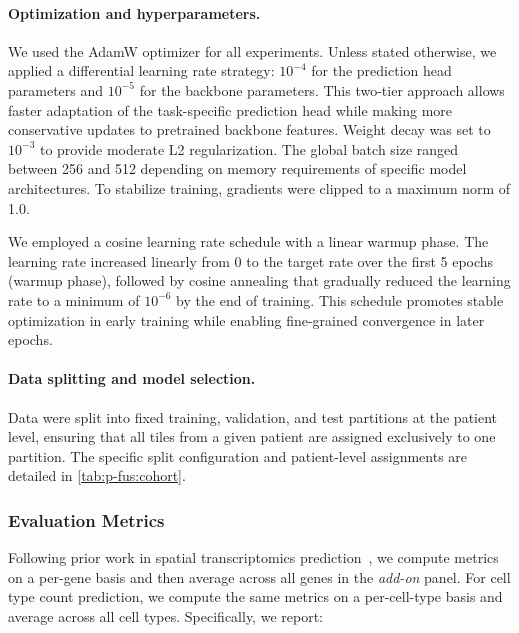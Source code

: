\paragraph{Optimization and hyperparameters.}
We used the AdamW optimizer for all experiments. Unless stated otherwise, we applied a differential learning rate strategy: $10^{-4}$ for the prediction head parameters and $10^{-5}$ for the backbone parameters. This two-tier approach allows faster adaptation of the task-specific prediction head while making more conservative updates to pretrained backbone features. Weight decay was set to $10^{-3}$ to provide moderate L2 regularization. The global batch size ranged between 256 and 512 depending on memory requirements of specific model architectures. To stabilize training, gradients were clipped to a maximum norm of 1.0.

We employed a cosine learning rate schedule with a linear warmup phase. The learning rate increased linearly from 0 to the target rate over the first 5 epochs (warmup phase), followed by cosine annealing that gradually reduced the learning rate to a minimum of $10^{-6}$ by the end of training. This schedule promotes stable optimization in early training while enabling fine-grained convergence in later epochs.

\paragraph{Data splitting and model selection.}
Data were split into fixed training, validation, and test partitions at the patient level, ensuring that all tiles from a given patient are assigned exclusively to one partition. The specific split configuration and patient-level assignments are detailed in \autoref{tab:p-fus:cohort}.

\subsubsection{Evaluation Metrics}
\label{sec:evaluation-metrics}

Following prior work in spatial transcriptomics prediction~\cite{chen_visualomicsfoundation_2025,gindra_largescalebenchmarkcrossmodal_2025}, we compute metrics on a per-gene basis and then average across all genes in the \emph{add-on} panel. For cell type count prediction, we compute the same metrics on a per-cell-type basis and average across all cell types. Specifically, we report:

